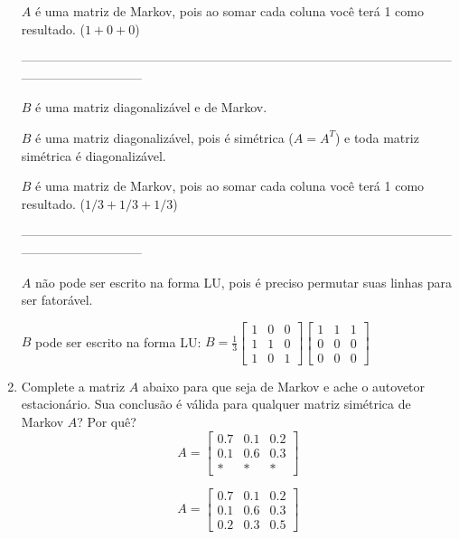 \documentclass[leqno]{article}
\numberwithin{equation}{section}
\begin{document}
\begin{enumerate}
\begin{sol}
			$A$ é uma matriz de Markov, pois ao somar cada coluna você terá 1 como resultado. ($1 + 0 + 0$)
			
			-----------------------------------------------------------------------------------------------------------------------------------
			
			$B$ é uma matriz diagonalizável e de Markov.
			
			$B$ é uma matriz diagonalizável, pois é simétrica ($A = A^T$) e toda matriz simétrica é diagonalizável.
			
			$B$ é uma matriz de Markov, pois ao somar cada coluna você terá 1 como resultado. ($1/3 + 1/3 + 1/3$)
			
			-----------------------------------------------------------------------------------------------------------------------------------
			
			$A$ não pode ser escrito na forma LU, pois é preciso permutar suas linhas para ser fatorável.
			
			$B$ pode ser escrito na forma LU:
			$B = \frac{1}{3}\begin{bmatrix}
				1 & 0 & 0 \\
				1 & 1 & 0 \\
				1 & 0 & 1
			\end{bmatrix}\begin{bmatrix}
				1 & 1 & 1 \\
				0 & 0 & 0 \\
				0 & 0 & 0
			\end{bmatrix}$
		\end{sol} 
		
		
		\item Complete a matriz $A$ abaixo para que seja de Markov e ache o autovetor estacionário. Sua conclusão é válida para qualquer matriz simétrica de Markov $A$? Por quê?
		$$A = \begin{bmatrix}
			0.7 & 0.1 & 0.2 \\
			0.1 & 0.6 & 0.3 \\
			* & * & *
		\end{bmatrix}$$
		
		\begin{sol} 
			$$A = \begin{bmatrix}
				0.7 & 0.1 & 0.2 \\
				0.1 & 0.6 & 0.3 \\
				0.2 & 0.3 & 0.5
			\end{bmatrix} $$
		

\end{sol}
\end{enumerate}
\end{document}
